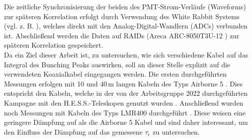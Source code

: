 Die zeitliche Synchronisierung der beiden des PMT-Strom-Verläufe (Waveforms) zur späteren Korrelation erfolgt durch Verwendung des White Rabbit Systems (vgl. z. B. \cite{lipinskiWhiteRabbitPTP2011}), welches direkt mit den Analog-Digital-Wandlern (ADCs) verbunden ist. 
Abschließend werden die Daten auf RAIDs (Areca ARC-8050T3U-12 \cite{ARC8050T3UThunderboltUSB}) zur späteren Korrelation gespeichert. \\
Da ein Ziel dieser Arbeit ist, zu untersuchen, wie sich verschiedene Kabel auf das Integral des Bunching Peaks auswirken, soll an dieser Stelle explizit auf die verwendeten Koaxialkabel eingegangen werden. 
Die ersten durchgeführten Messungen erfolgen mit 10 und 40\,m langen Kabeln des Typs Airborne 5 \cite{s.r.lAirborne10Coaxial}. 
Dies entspricht den Kabeln, welche in der von der Arbeitsgruppe 2022 durchgeführten Kampagne mit den H.E.S.S.-Teleskopen genutzt wurden \cite{zmijaFirstIntensityInterferometry2023}. 
Anschließend wurden noch Messungen mit Kabeln des Typs LMR400 durchgeführt \cite{LMR400CoaxCable}. 
Diese weisen eine geringere Dämpfung auf als die Airborne 5 Kabel und sind daher interessant, um den Einfluss der Dämpfung auf das gemessene $\tau_{\mathrm{c}}$ zu untersuchen. \\

